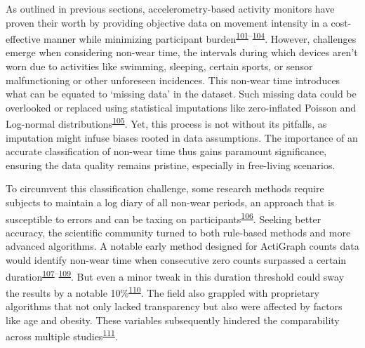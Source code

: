 \documentclass[
  10pt,
]{scrbook}
\begin{document}
As outlined in previous sections, accelerometry-based activity monitors
have proven their worth by providing objective data on movement
intensity in a cost-effective manner while minimizing participant
burden\textsuperscript{\protect\hyperlink{ref-dowd_systematic_2018}{101}--\protect\hyperlink{ref-migueles_comparability_2019}{104}}.
However, challenges emerge when considering non-wear time, the intervals
during which devices aren't worn due to activities like swimming,
sleeping, certain sports, or sensor malfunctioning or other unforeseen
incidences. This non-wear time introduces what can be equated to
`missing data' in the dataset. Such missing data could be overlooked or
replaced using statistical imputations like zero-inflated Poisson and
Log-normal
distributions\textsuperscript{\protect\hyperlink{ref-lee_missing_2018}{105}}.
Yet, this process is not without its pitfalls, as imputation might
infuse biases rooted in data assumptions. The importance of an accurate
classification of non-wear time thus gains paramount significance,
ensuring the data quality remains pristine, especially in free-living
scenarios.

To circumvent this classification challenge, some research methods
require subjects to maintain a log diary of all non-wear periods, an
approach that is susceptible to errors and can be taxing on
participants\textsuperscript{\protect\hyperlink{ref-ainsworth_recommendations_2012}{106}}.
Seeking better accuracy, the scientific community turned to both
rule-based methods and more advanced algorithms. A notable early method
designed for ActiGraph counts data would identify non-wear time when
consecutive zero counts surpassed a certain
duration\textsuperscript{\protect\hyperlink{ref-hecht_methodology_2009}{107}--\protect\hyperlink{ref-troiano_how_2020}{109}}.
But even a minor tweak in this duration threshold could sway the results
by a notable
10\%\textsuperscript{\protect\hyperlink{ref-aadland_comparison_2018}{110}}.
The field also grappled with proprietary algorithms that not only lacked
transparency but also were affected by factors like age and obesity.
These variables subsequently hindered the comparability across multiple
studies\textsuperscript{\protect\hyperlink{ref-toftager_accelerometer_2013}{111}}.
\end{document}
